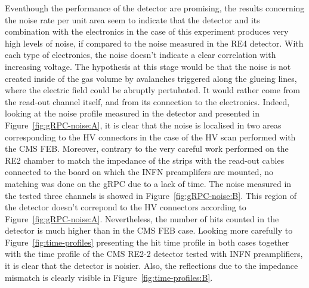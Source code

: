     Eventhough the performance of the detector are promising, the results concerning the noise rate per unit area seem to indicate that the detector and its combination with the electronics in the case of this experiment produces very high levels of noise, if compared to the noise measured in the RE4 detector. With each type of electronics, the noise doesn't indicate a clear correlation with increasing voltage. The hypothesis at this stage would be that the noise is not created inside of the gas volume by avalanches triggered along the glueing lines, where the electric field could be abruptly pertubated. It would rather come from the read-out channel itself, and from its connection to the electronics. Indeed, looking at the noise profile measured in the detector and presented in Figure~\ref{fig:gRPC-noise:A}, it is clear that the noise is localised in two areas corresponding to the HV connectors in the case of the HV scan performed with the CMS FEB. Moreover, contrary to the very careful work performed on the RE2 chamber to match the impedance of the strips with the read-out cables connected to the board on which the INFN preamplifers are mounted, no matching was done on the gRPC due to a lack of time. The noise measured in the tested three channels is showed in Figure~\ref{fig:gRPC-noise:B}. This region of the detector doesn't correpond to the HV connectors according to Figure~\ref{fig:gRPC-noise:A}. Nevertheless, the number of hits counted in the detector is much higher than in the CMS FEB case. Looking more carefully to Figure~\ref{fig:time-profiles} presenting the hit time profile in both cases together with the time profile of the CMS RE2-2 detector tested with INFN preamplifiers, it is clear that the detector is noisier. Also, the reflections due to the impedance mismatch is clearly visible in Figure~\ref{fig:time-profiles:B}.
	
